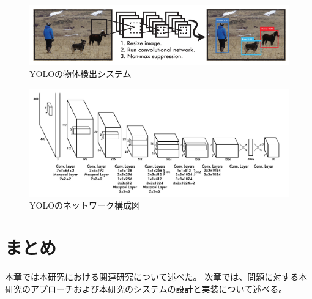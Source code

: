 \begin{figure}[htbp]
  \begin{center}
    \includegraphics[width=\textwidth]{figs/Yolo_Detection_system.png}
    \caption{YOLOの物体検出システム\cite{yolov3}}
    \label{fig:yolo_system}
  \end{center}
\end{figure}

\begin{figure}[htbp]
  \begin{center}
    \includegraphics[width=\textwidth]{figs/yolo_architecture.png}
    \caption{YOLOのネットワーク構成図\cite{yolov3}}
    \label{fig:yolo_network}
  \end{center}
 \end{figure}

 \section{まとめ}
 本章では本研究における関連研究について述べた。
 次章では、問題に対する本研究のアプローチおよび本研究のシステムの設計と実装について述べる。